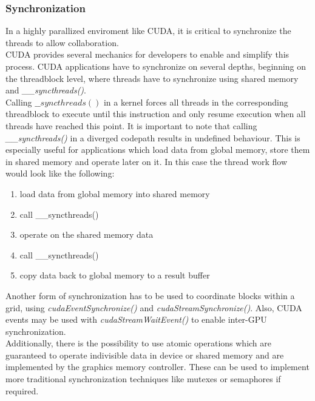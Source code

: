 \subsubsection{Synchronization}
\label{sync}
In a highly parallized enviroment like CUDA, it is critical to synchronize the threads to allow collaboration.\\
CUDA provides several mechanics for developers to enable and simplify this process.
CUDA applications have to synchronize on several depths, beginning on the threadblock level, where threads have to synchronize using shared memory and \emph{\_\_syncthreads()}.\\
Calling $\_\_syncthreads()$ in a kernel forces all threads in the corresponding threadblock to execute until this instruction and only resume execution when all
threads have reached this point. It is important to note that calling \emph{\_\_syncthreads()} in a diverged codepath results in undefined behaviour.
This is especially useful for applications which load data from global memory, store them in shared memory and operate later on it.
In this case the thread work flow would look like the following:\\
\begin{enumerate}
    \item load data from global memory into shared memory
    \item call \_\_syncthreads()
    \item operate on the shared memory data
    \item call \_\_syncthreads()
    \item copy data back to global memory to a result buffer
\end{enumerate}
Another form of synchronization has to be used to coordinate blocks within a grid, using \emph{cudaEventSynchronize()} and \emph{cudaStreamSynchronize()}.
Also, CUDA events may be used with \emph{cudaStreamWaitEvent()} to enable inter-GPU synchronization.\\
Additionally, there is the possibility to use atomic operations which are guaranteed to operate indivisible data in device or shared memory and are implemented by the graphics memory controller.
These can be used to implement more traditional synchronization techniques like mutexes or semaphores if required.\\
